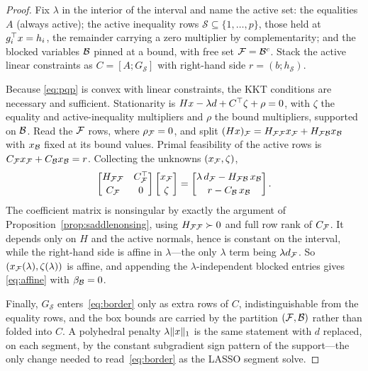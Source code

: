 \begin{proof}
Fix $\lambda$ in the interior of the interval and name the active set: the
equalities $A$ (always active); the active inequality rows
$\mathcal{S} \subseteq \{1,\dots,p\}$, those held at $g_i^{\top} x = h_i$, the remainder
carrying a zero multiplier by complementarity; and the blocked variables $\mathcal{B}$
pinned at a bound, with free set $\mathcal{F} = \mathcal{B}^c$. Stack the active linear
constraints as $C = [A; G_{\mathcal{S}}]$ with right-hand side
$r = (b; h_{\mathcal{S}})$.

Because \eqref{eq:pqp} is convex with linear constraints, the KKT conditions are
necessary and sufficient. Stationarity is $Hx - \lambda d + C^{\top}\zeta + \rho = 0$,
with $\zeta$ the equality and active-inequality multipliers and $\rho$ the bound
multipliers, supported on $\mathcal{B}$. Read the $\mathcal{F}$ rows, where $\rho_{\mathcal{F}} = 0$,
and split $(Hx)_{\mathcal{F}} = H_{\mathcal{F}\mathcal{F}}x_{\mathcal{F}} + H_{\mathcal{F}\mathcal{B}}x_{\mathcal{B}}$ with
$x_{\mathcal{B}}$ fixed at its bound values. Primal feasibility of the active rows is
$C_{\mathcal{F}} x_{\mathcal{F}} + C_{\mathcal{B}} x_{\mathcal{B}} = r$. Collecting the unknowns
$(x_{\mathcal{F}},\zeta)$,
\begin{equation}
\label{eq:border}
\begin{bmatrix} H_{\mathcal{F}\mathcal{F}} & C_{\mathcal{F}}^{\top} \\[2pt] C_{\mathcal{F}} & 0 \end{bmatrix}
\begin{bmatrix} x_{\mathcal{F}} \\[2pt] \zeta \end{bmatrix}
=
\begin{bmatrix} \lambda\, d_{\mathcal{F}} - H_{\mathcal{F}\mathcal{B}}\,x_{\mathcal{B}} \\[2pt]
                r - C_{\mathcal{B}}\,x_{\mathcal{B}} \end{bmatrix}.
\end{equation}
The coefficient matrix is nonsingular by exactly the argument of
Proposition~\ref{prop:saddlenonsing}, using $H_{\mathcal{F}\mathcal{F}}\succ0$ and full row rank
of $C_{\mathcal{F}}$. It depends only on $H$ and the active normals, hence is constant on
the interval, while the right-hand side is affine in $\lambda$---the only $\lambda$
term being $\lambda d_{\mathcal{F}}$. So $(x_{\mathcal{F}}(\lambda),\zeta(\lambda))$ is affine, and
appending the $\lambda$-independent blocked entries gives \eqref{eq:affine} with
$\beta_{\mathcal{B}} = 0$.

Finally, $G_{\mathcal{S}}$ enters~\eqref{eq:border} only as extra rows of $C$,
indistinguishable from the equality rows, and the box bounds are carried by the
partition $(\mathcal{F},\mathcal{B})$ rather than folded into $C$. A polyhedral penalty
$\lambda\lVert x \rVert_1$ is the same statement with $d$ replaced, on each segment, by the
constant subgradient sign pattern of the support---the only change needed to
read~\eqref{eq:border} as the LASSO segment solve.
\end{proof}


